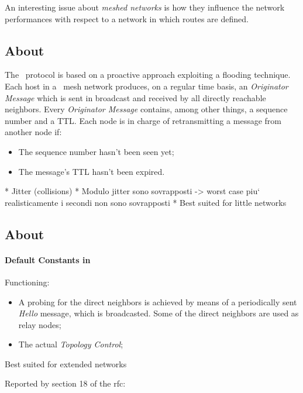 An interesting issue about \emph{meshed networks} is how they
influence the network performances with respect to a network in which
routes are defined.

\subsection{About \batman}

    The \batman\ protocol is based on a proactive approach exploiting a
    flooding technique. Each host in a \batman\ mesh network produces, on a
    regular time basis, an \emph{Originator Message} which is sent in
    broadcast and received by all directly reachable neighbors. Every
    \emph{Originator Message} contains, among other things, a sequence
    number and a TTL. Each node is in charge of retransmitting a message
    from another node if:
    \begin{itemize}
    \item   The sequence number hasn't been seen yet;
    \item   The message's TTL hasn't been expired.
    \end{itemize}

    * Jitter (collisions)
    * Modulo jitter sono sovrapposti -> worst case
        piu` realisticamente i secondi non sono sovrapposti
    * Best suited for little networks

\subsection{About \olsr}

    \paragraph{Default Constants in \olsr}

        Functioning:
        \begin{itemize}
        \item   A probing for the direct neighbors is achieved by means of
                a periodically sent \emph{Hello} message, which is
                broadcasted. Some of the direct neighbors are used as
                relay nodes;
        \item   The actual \emph{Topology Control};
        \end{itemize}

        Best suited for extended networks

        Reported by section 18 of the rfc:

